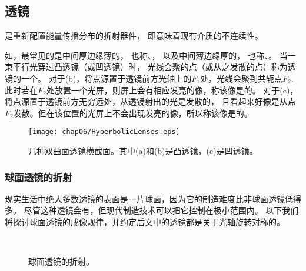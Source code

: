 \subsection{透镜}\label{sub:透镜}
\begin{definition}
    是重新配置能量传播分布的折射器件，
    即意味着现有介质的不连续性。
\end{definition}

如，最常见的是中间厚边缘薄的，
也称、，
以及中间薄边缘厚的，
也称、。
当一束平行光穿过凸透镜（或凹透镜）时，
光线会聚的点（或从之发散的点）称为透镜的一个。
对于(b)，将点源置于透镜前方光轴上的$F_1$处，光线会聚到共轭点$F_2$.
此时若在$F_2$处放置一个光屏，则屏上会有相应发亮的像，称该像是的。
对于(c)，将点源置于透镜前方无穷远处，从透镜射出的光是发散的，
且看起来好像是从点$F_2$发散。但在该位置的光屏上不会出现发亮的像，所以称该像是的。
\begin{figure}[htbp]
    \centering\texttt{[image: chap06/HyperbolicLenses.eps]}
    \caption{几种双曲面透镜横截面。其中(a)和(b)是凸透镜，(c)是凹透镜。}
    \label{fig:6.30}
\end{figure}

\subsubsection{球面透镜的折射}
现实生活中绝大多数透镜的表面是一片球面，因为它的制造难度比非球面透镜低得多。
尽管这种透镜会有，但现代制造技术可以把它控制在极小范围内。
以下我们将探讨球面透镜的成像规律，并约定后文中的透镜都是关于光轴旋转对称的。
\begin{figure}[htbp]
    \centering
    \,
    \caption{球面透镜的折射。}
    \label{fig:6.31}
\end{figure}

